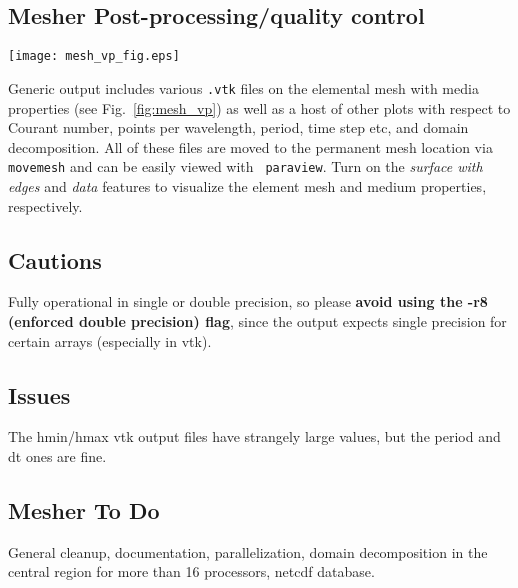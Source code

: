 \documentclass[11pt,letter,fleqn,english,notitlepage]{article}
\begin{document}
\subsection{Mesher Post-processing/quality control }
\begin{figure*}[htb]
\begin{center}\label{fig:mesh_vp}
\texttt{[image: mesh\_vp\_fig.eps]}
\caption{\textit{The elemental mesh (blue lines) for IASP91 at 20 seconds superimposed on the $v_p$ velocity. 
The plot is derived straight from the file {\tt mesh\_vp.vtk} produced by the mesher. Zoom sections of the 
central region and crust/upper mantle are added to highlight the topological features.}}
\end{center}
\end{figure*}
%
\noindent Generic output includes various {\tt *.vtk} files on the elemental
mesh with media properties (see Fig.~\ref{fig:mesh_vp}) as well as a host of
other plots with respect to Courant number, points per wavelength, period, time
step etc, and domain decomposition.  All of these files are moved to the
permanent mesh location via {\tt movemesh} and can be easily viewed with {\tt
paraview}. Turn on the \textit{surface with edges} and \textit{data} features
to visualize the element mesh and medium properties, respectively.

\subsection{Cautions}
Fully operational in single or double precision, so please 
\textbf{avoid using the -r8 (enforced double precision) flag}, 
since the output expects single precision for certain arrays (especially in vtk).

\subsection{Issues}
The hmin/hmax vtk output files have strangely large values, but the period and dt ones are fine.

\subsection{Mesher To Do}
General cleanup, documentation, parallelization, domain decomposition in the central region for 
more than 16 processors, netcdf database.

\newpage
\end{document}
